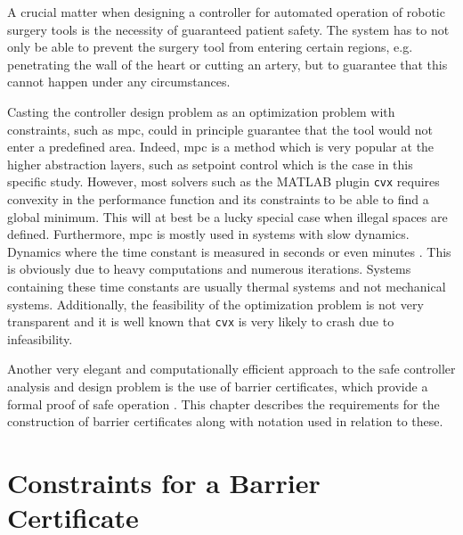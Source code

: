 A crucial matter when designing a controller for automated operation of robotic surgery tools is the necessity of guaranteed patient safety. The system has to not only be able to prevent the surgery tool from entering certain regions, e.g. penetrating the wall of the heart or cutting an artery, but to guarantee that this cannot happen under any circumstances.

Casting the controller design problem as an optimization problem with constraints, such as \gls{mpc}, could in principle guarantee that the tool would not enter a predefined area. Indeed, \gls{mpc} is a method which is very popular at the higher abstraction layers, such as setpoint control \citep{bib:mpc_simon} which is the case in this specific study. However, most solvers such as the MATLAB plugin \texttt{cvx} requires convexity in the performance function and its constraints to be able to find a global minimum. This will at best be a lucky special case when illegal spaces are defined. Furthermore, \gls{mpc} is mostly used in systems with slow dynamics. Dynamics where the time constant is measured in seconds or even minutes \citep{bib:mpc_slow}. This is obviously due to heavy computations and numerous iterations. Systems containing these time constants are usually thermal systems and not mechanical systems. Additionally, the feasibility of the optimization problem is not very transparent and it is well known that \texttt{cvx} is very likely to crash due to infeasibility.

Another very elegant and computationally efficient approach to the safe controller analysis and design problem is the use of barrier certificates, which provide a formal proof of safe operation \citep{bib:safety}. This chapter describes the requirements for the construction of barrier certificates along with notation used in relation to these.
%
%
%
%
%
\section{Constraints for a Barrier Certificate}\label{sec:safety-def}

